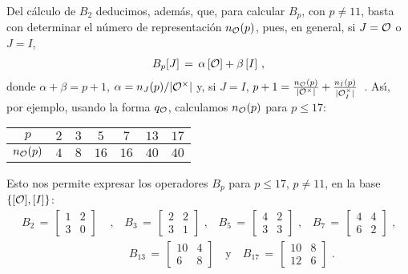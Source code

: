 Del c\'{a}lculo de $B_{2}$ deducimos, adem\'{a}s, que, para calcular $B_{p}$,
con $p\not=11$, basta con determinar el n\'{u}mero de representaci\'{o}n
$n_{\cal{O}}(p)$, pues, en general, si $J=\cal{O}$ o $J=I$,
\begin{align*}
	B_{p}[J] \,=\,\alpha\,[\cal{O}]+\beta\,[I]
	\text{ ,}
\end{align*}
%
donde $\alpha +\beta=p+1$, $\alpha=n_{J}(p)/|\cal{O}^{\times}|$ y,
si $J=I$,
\begin{math}
	p+1=\frac{n_{\cal{O}}(p)}{|\cal{O}^{\times}|}
		+\frac{n_{I}(p)}{|\cal{O}_{I}^{\times}|}
\end{math}~.
As\'{\i}, por ejemplo, usando la forma $q_{\cal{O}}$, calculamos
$n_{\cal{O}}(p)$ para $p\leq 17$:
\begin{center}
	\begin{tabular}{c|cccccc}
		$p$ & $2$ & $3$ & $5$ & $7$ & $13$ & $17$ \\
		\hline
		$n_{\cal{O}}(p)$ & $4$ & $8$ & $16$ & $16$ & $40$ & $40$
	\end{tabular}
\end{center}
Esto nos permite expresar los operadores $B_{p}$ para $p\leq 17$, $p\not=11$,
en la base $\{[\cal{O}],[I]\}$:
\begin{align*}
	B_{2}\,=\,\begin{bmatrix} 1 & 2 \\ 3 & 0 \end{bmatrix} & \text{ ,}\quad
		B_{3}\,=\,\begin{bmatrix} 2 & 2 \\ 3 & 1 \end{bmatrix}
			\text{ ,}\quad
		B_{5}\,=\,\begin{bmatrix} 4 & 2 \\ 3 & 3 \end{bmatrix}
			\text{ ,}\quad
		B_{7}\,=\,\begin{bmatrix} 4 & 4 \\ 6 & 2 \end{bmatrix}
			\text{ ,} \\
	& \qquad
	B_{13}\,=\,\begin{bmatrix} 10 & 4 \\ 6 & 8 \end{bmatrix}
			\quad\text{y}\quad
		B_{17}\,=\,\begin{bmatrix} 10 & 8 \\ 12 & 6 \end{bmatrix}
	\text{ .}
\end{align*}
%

